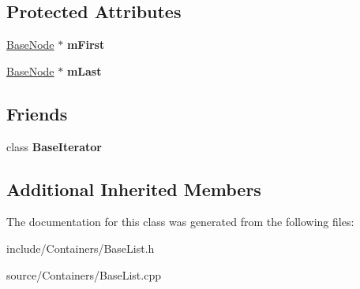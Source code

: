 \subsection*{Protected Attributes}
\begin{DoxyCompactItemize}
\item 
\hyperlink{classDE_1_1BaseList_1_1BaseNode}{Base\+Node} $\ast$ {\bfseries m\+First}\hypertarget{classDE_1_1BaseList_ac5593890d21a73cfa4c837f87b5db5b1}{}\label{classDE_1_1BaseList_ac5593890d21a73cfa4c837f87b5db5b1}

\item 
\hyperlink{classDE_1_1BaseList_1_1BaseNode}{Base\+Node} $\ast$ {\bfseries m\+Last}\hypertarget{classDE_1_1BaseList_a757f5ad3193919dd4e81f259e07b07af}{}\label{classDE_1_1BaseList_a757f5ad3193919dd4e81f259e07b07af}

\end{DoxyCompactItemize}
\subsection*{Friends}
\begin{DoxyCompactItemize}
\item 
class {\bfseries Base\+Iterator}\hypertarget{classDE_1_1BaseList_a95d719a456031e0a03c45a657435f35b}{}\label{classDE_1_1BaseList_a95d719a456031e0a03c45a657435f35b}

\end{DoxyCompactItemize}
\subsection*{Additional Inherited Members}


The documentation for this class was generated from the following files\+:\begin{DoxyCompactItemize}
\item 
include/\+Containers/Base\+List.\+h\item 
source/\+Containers/Base\+List.\+cpp\end{DoxyCompactItemize}
